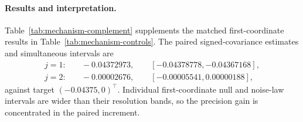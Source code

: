 \paragraph{Results and interpretation.}
Table~\ref{tab:mechanism-complement} supplements the matched
first-coordinate results in Table~\ref{tab:mechanism-controls}.
The paired signed-covariance estimates and simultaneous intervals are
\[
\begin{aligned}
 j=1:&\quad -0.04372973,\qquad [-0.04378778,-0.04367168],\\
 j=2:&\quad -0.00002676,\qquad [-0.00005541,0.00000188],
\end{aligned}
\]
against target $(-0.04375,0)^\top$. Individual first-coordinate null
and noise-law intervals are wider than their resolution bands, so the
precision gain is concentrated in the paired increment.

